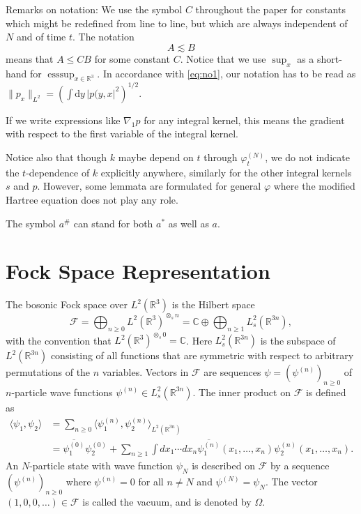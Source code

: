 \documentclass[11pt,a4paper,draft,DIV11]{scrartcl}	%
\newcommand{\R}{\mathds{R}}
\newcommand{\di}{\textrm{d}}		%
\newcommand{\Rbb}{\mathbb{R}}		%
\newcommand{\norm}[1]{\lVert#1\rVert}	%
\newcommand{\ph}{\varphi_t^{(N)}}	%
\newcommand{\eqr}[1]{\eqref{eq:#1}}			%
\begin{document}
Remarks on notation: We use the symbol $C$ throughout the paper for constants which might be redefined from line to line, but which are always independent of $N$ and of time $t$.
The notation
\[
  A \apprle B
\]
means that $A \le C B$ for some constant $C$.
Notice that we use $\sup_x$ as a short-hand for $\operatorname{esssup}_{x\in \Rbb^3}$. In accordance with \eqr{no1}, our notation has to be read as $\norm{p_x}_{L^2} = \left( \int \di y\, \lvert p(y,x\rvert^2 \right)^{1/2}$.

If we write expressions like $\nabla_1 p$ for any integral kernel, this means the gradient with respect to the first variable of the integral kernel.

Notice also that though $k$ maybe depend on $t$ through $\ph$, we do not indicate the $t$-dependence of $k$ explicitly anywhere, similarly for the other integral kernels $s$ and $p$. However, some lemmata are formulated for general $\varphi$ where the modified Hartree equation does not play any role.

The symbol $a^{\#}$ can stand for both $a^\ast$ as well as $a$.

\section{Fock Space Representation}
The bosonic Fock space over $L^2(\R^3)$ is the Hilbert space
\[
  \mathcal{F} = \bigoplus_{n \ge 0} L^2(\R^3)^{\otimes_s n} = \mathds{C}
  \oplus \bigoplus_{n \ge 1} L^2_s(\R^{3n}),
\]
with the convention that $L^2(\R^3)^{\otimes_s 0} = \mathds{C}$. Here
$L^2_s(\R^{3n})$ is the subspace of $L^2(\R^{3n})$ consisting of all functions
that are symmetric with respect to arbitrary permutations of the $n$
variables. Vectors in $\mathcal{F}$ are sequences $\psi = (\psi^{(n)})_{n
\ge 0}$ of $n$-particle wave functions $\psi^{(n)} \in L^2_s(\R^{3n})$. The
inner product on $\mathcal{F}$ is defined as
\begin{align*}
  \langle \psi_1, \psi_2 \rangle & = \sum_{n \ge 0} \langle \psi_1^{(n)},
  \psi_2^{(n)} \rangle_{L^2(\R^{3n})} \\
  & = \overline{\psi_1^{(0)}} \psi_2^{(0)} + \sum_{n \ge 1} \int dx_1 \cdots
  dx_n \overline{\psi_1^{(n)}}(x_1, \dots, x_n) \psi_2^{(n)}(x_1, \dots, x_n).
\end{align*}
An $N$-particle state with wave function $\psi_N$ is described on
$\mathcal{F}$ by a sequence $(\psi^{(n)})_{n \ge 0}$ where $\psi^{(n)} =
0$ for all $n \neq N$ and $\psi^{(N)} = \psi_N$. The vector $(1, 0, 0, \dots
) \in \mathcal{F}$ is called the vacuum, and is denoted by $\Omega$.
\end{document}
